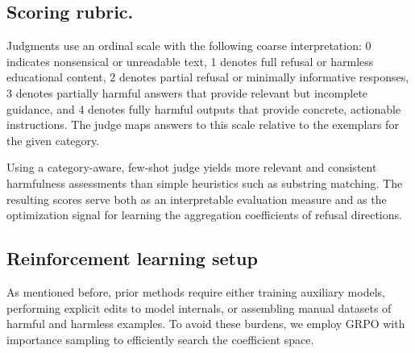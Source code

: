 \documentclass{article}
\theoremstyle{plain}
\theoremstyle{definition}
\theoremstyle{remark}
\begin{document}

\subsection{Scoring rubric.}
Judgments use an ordinal scale with the following coarse interpretation: 0 indicates nonsensical or unreadable text, 1 denotes full refusal or harmless educational content, 2 denotes partial refusal or minimally informative responses, 3 denotes partially harmful answers that provide relevant but incomplete guidance, and 4 denotes fully harmful outputs that provide concrete, actionable instructions. The judge maps answers to this scale relative to the exemplars for the given category.


Using a category-aware, few-shot judge yields more relevant and consistent harmfulness assessments than simple heuristics such as substring matching. The resulting scores serve both as an interpretable evaluation measure and as the optimization signal for learning the aggregation coefficients of refusal directions.

\subsection{Reinforcement learning setup} \label{subsec:grpo_setup}

As mentioned before, prior methods require either training auxiliary models, performing explicit edits to model internals, or assembling manual datasets of harmful and harmless examples. To avoid these burdens, we employ GRPO with importance sampling to efficiently search the coefficient space.
\end{document}
